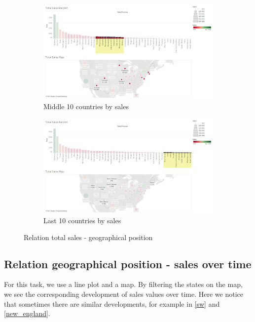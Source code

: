 \documentclass[openany]{article}
\begin{document}
\begin{figure}[h]\ContinuedFloat
	\centering
	\begin{subfigure}{\textwidth}
		\centering
		\includegraphics[width=\linewidth]{Tableau/a_3}
		\caption{Middle 10 countries by sales}
	\end{subfigure}

	\begin{subfigure}{\textwidth}
		\centering
		\includegraphics[width=\linewidth]{Tableau/a_1}
		\caption{Last 10 countries by sales}
	\end{subfigure}
	\caption{Relation total sales - geographical position}
\end{figure}

\clearpage

\subsection{Relation geographical position - sales over time}

For this task, we use a line plot and a map.
By filtering the states on the map, we see the corresponding development of sales values over time.
Here we notice that sometimes there are similar developments, for example in \ref {sw} and \ref {new_england}.
\end{document}
